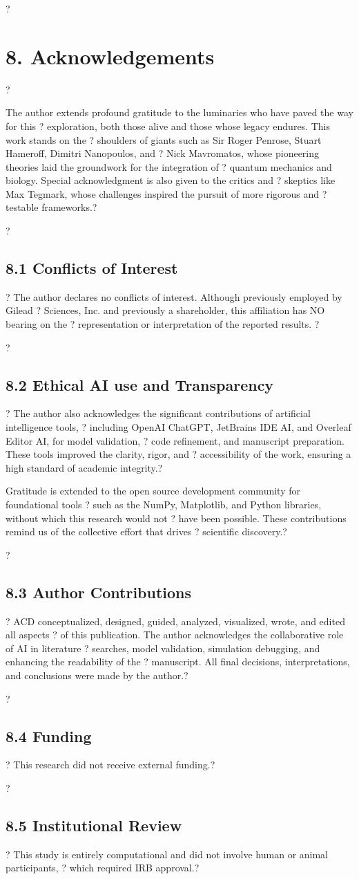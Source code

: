 ?\section{8. Acknowledgements}?

The author extends profound gratitude to the luminaries who have paved the way for this ?
exploration, both those alive and those whose legacy endures. This work stands on the ?
shoulders of giants such as Sir Roger Penrose, Stuart Hameroff, Dimitri Nanopoulos, and ?
Nick Mavromatos, whose pioneering theories laid the groundwork for the integration of ?
quantum mechanics and biology. Special acknowledgment is also given to the critics and ?
skeptics like Max Tegmark, whose challenges inspired the pursuit of more rigorous and ?
testable frameworks.?

?\subsection{8.1 Conflicts of Interest}?
The author declares no conflicts of interest. Although previously employed by Gilead ?
Sciences, Inc. and previously a shareholder, this affiliation has NO bearing on the ?
representation or interpretation of the reported results. ?

?\subsection{8.2 Ethical AI use and Transparency}?
The author also acknowledges the significant contributions of artificial intelligence tools, ?
including OpenAI ChatGPT, JetBrains IDE AI, and Overleaf Editor AI, for model validation, ?
code refinement, and manuscript preparation. These tools improved the clarity, rigor, and ?
accessibility of the work, ensuring a high standard of academic integrity.?

Gratitude is extended to the open source development community for foundational tools ?
such as the NumPy, Matplotlib, and Python libraries, without which this research would not ?
have been possible. These contributions remind us of the collective effort that drives ?
scientific discovery.?

?\subsection{8.3 Author Contributions}?
ACD conceptualized, designed, guided, analyzed, visualized, wrote, and edited all aspects ?
of this publication. The author acknowledges the collaborative role of AI in literature ?
searches, model validation, simulation debugging, and enhancing the readability of the ?
manuscript. All final decisions, interpretations, and conclusions were made by the author.?

?\subsection{8.4 Funding}?
This research did not receive external funding.?

?\subsection{8.5 Institutional Review}?
This study is entirely computational and did not involve human or animal participants, ?
which required IRB approval.?


